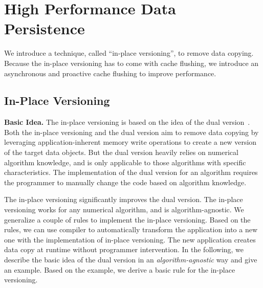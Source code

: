 \section{High Performance Data Persistence}
\label{sec:design}
We introduce a technique, called ``in-place versioning'', to remove data copying. %
Because the in-place versioning has to come with cache flushing, 
we introduce an asynchronous and proactive
cache flushing %
to improve performance.

\subsection{In-Place Versioning}
\textbf{Basic Idea.}
The in-place versioning is based on the idea of the dual version~\cite{hpdc16:wu}.
Both the in-place versioning and the dual version aim to remove data copying by leveraging application-inherent memory write operations to create a new version of the target data objects. But the dual version heavily relies on numerical algorithm knowledge, and is only applicable to those algorithms with specific characteristics.
The implementation of the dual version for an algorithm requires the programmer to manually change the code based on algorithm knowledge.

The in-place versioning significantly improves the dual version.
The in-place versioning works for any numerical algorithm, and is algorithm-agnostic. We generalize a couple of rules to implement the in-place versioning.
Based on the rules, we can use compiler to automatically transform the application into a new one with the implementation of in-place versioning. The new application creates data copy at runtime without programmer intervention. In the following, we describe the basic idea of the dual version in an \textit{algorithm-agnostic} way and give an example. Based on the example, we derive a basic rule for the in-place versioning.

